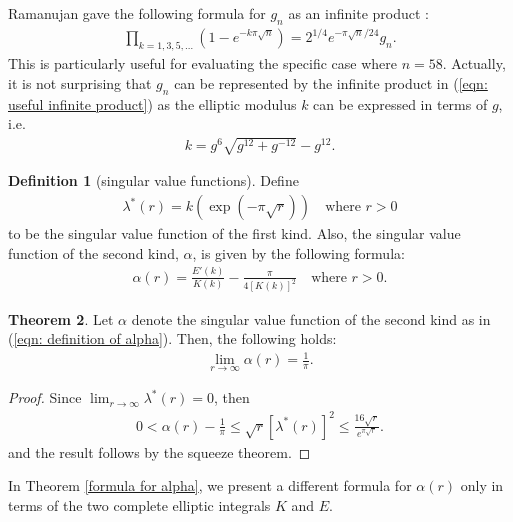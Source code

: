 \documentclass[11pt]{amsart}
\theoremstyle{definition}
\newtheorem{theorem}{Theorem}[section]
\numberwithin{theorem}{section}
\newtheorem{definition}[theorem]{Definition}
\begin{document}
Ramanujan gave the following formula for $g_n$ as an infinite product \cite{ramanujan modular}: \begin{align}\label{eqn: useful infinite product}
    \prod_{k=1,3,5,\ldots}\left(1-e^{-k\pi\sqrt{n}}\right)=2^{1/4}e^{-\pi\sqrt{n}/24}g_n.
\end{align}
This is particularly useful for evaluating the specific case where $n=58$. Actually, it is not surprising that $g_n$ can be represented by the infinite product in (\ref{eqn: useful infinite product}) as the elliptic modulus $k$ can be expressed in terms of $g$, i.e. 
\begin{align*}
        k=g^6\sqrt{g^{12}+g^{-12}}-g^{12}.
    \end{align*}
\begin{definition}[singular value functions]
    Define \begin{align}\label{eqn: singular value function of the first kind}
        \lambda^\ast\left(r\right)=k\left(\operatorname{exp}\left(-\pi\sqrt{r}\right)\right)\quad \text{where }r>0
    \end{align}
    to be the singular value function of the first kind. Also, the singular value function of the second kind, $\alpha$, is given by the following formula:
    \begin{align}\label{eqn: definition of alpha}
        \alpha\left(r\right)=\frac{E'\left(k\right)}{K\left(k\right)}-\frac{\pi}{4\left[K\left(k\right)\right]^2}\quad\text{where }r>0.
    \end{align}
\end{definition}
\begin{theorem} Let $\alpha$ denote the singular value function of the second kind as in (\ref{eqn: definition of alpha}). Then, the following holds:
    \begin{align*}
        \lim_{r\rightarrow\infty}\alpha\left(r\right)=\frac{1}{\pi}.
    \end{align*}
\end{theorem}
\begin{proof}
    Since $\displaystyle \lim_{r\rightarrow\infty}\lambda^\ast\left(r\right)=0$, then \begin{align*}
        0<\alpha\left(r\right)-\frac{1}{\pi}\le \sqrt{r}\left[\lambda^\ast\left(r\right)\right]^2\le \frac{16\sqrt{r}}{e^{\pi\sqrt{r}}}.
    \end{align*}
    and the result follows by the squeeze theorem.
\end{proof}
In Theorem \ref{formula for alpha}, we present a different formula for $\alpha\left(r\right)$ only in terms of the two complete elliptic integrals $K$ and $E$.
\end{document}
